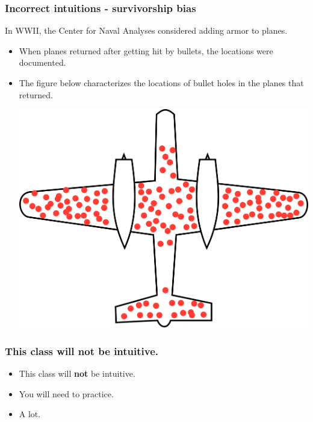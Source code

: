 \begin{frame}
\frametitle{Incorrect intuitions - survivorship bias}
In WWII, the Center for Naval Analyses considered adding armor to planes.

\pause 
 
\begin{itemize}
\item When planes returned after getting hit by bullets, the locations were documented.

\pause
\item The figure below characterizes the locations of bullet holes in the planes that returned.
\begin{center}
\includegraphics[scale=0.25]{1-1_case_study/figures/plane}
\end{center}
\end{itemize}

\end{frame}


\begin{frame}
\frametitle{This class will {\bf not} be intuitive.}
\begin{itemize}
\item This class will {\bf not} be intuitive.
\pause
\item You will need to practice.
\pause
\item A lot.
\end{itemize}
\end{frame}





